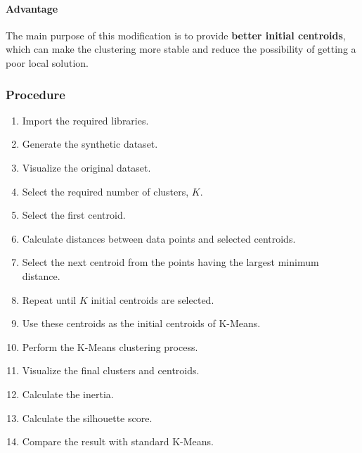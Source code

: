 \documentclass[a4paper,11pt]{article}
\begin{document}
\paragraph{Advantage}
The main purpose of this modification is to provide \textbf{better initial centroids}, which can make the clustering more stable and reduce the possibility of getting a poor local solution.

\subsubsection{Procedure}
\begin{enumerate}
    \item Import the required libraries.
    \item Generate the synthetic dataset.
    \item Visualize the original dataset.
    \item Select the required number of clusters, $K$.
    \item Select the first centroid.
    \item Calculate distances between data points and selected centroids.
    \item Select the next centroid from the points having the largest minimum distance.
    \item Repeat until $K$ initial centroids are selected.
    \item Use these centroids as the initial centroids of K-Means.
    \item Perform the K-Means clustering process.
    \item Visualize the final clusters and centroids.
    \item Calculate the inertia.
    \item Calculate the silhouette score.
    \item Compare the result with standard K-Means.
\end{enumerate}
\end{document}
